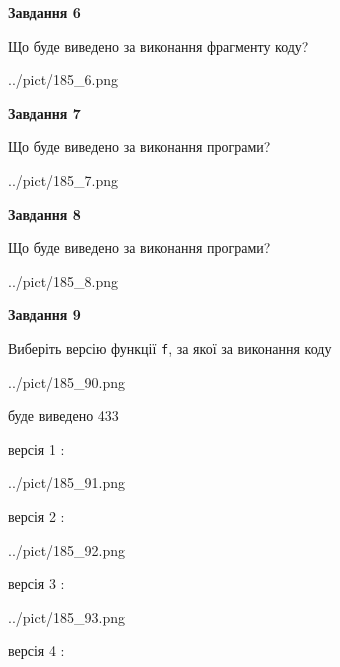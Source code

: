 \documentclass[12pt, ukrainian]{article}
\def\code#1{\Verb!#1!}
\begin{document}
{\begin {large}
{\begin {center}\textbf{Завдання 6}\end {center}}

Що буде виведено за виконання фрагменту коду?\par
\begin{center}
	{../pict/185_6.png}
\end{center}
\newpage

{\begin {center}\textbf{Завдання 7}\end {center}}

Що буде виведено за виконання програми?\par
\begin{center}
	{../pict/185_7.png}
\end{center}
\newpage

{\begin {center}\textbf{Завдання 8}\end {center}}

Що буде виведено за виконання програми?\par
\begin{center}
	{../pict/185_8.png}
\end{center}
\newpage

{\begin {center}\textbf{Завдання 9}\end {center}}

Виберіть версію функції \code{f}, за якої за виконання коду
\begin{center}
	{../pict/185_90.png}
\end{center}
буде виведено 433

\vspace{5mm}
версія 1 :

\begin{center}
	{../pict/185_91.png}
\end{center}
версія 2 :

\begin{center}
	{../pict/185_92.png}
\end{center}
версія 3 :

\begin{center}
	{../pict/185_93.png}
\end{center}
версія 4 :


\end{large}}
\end{document}
